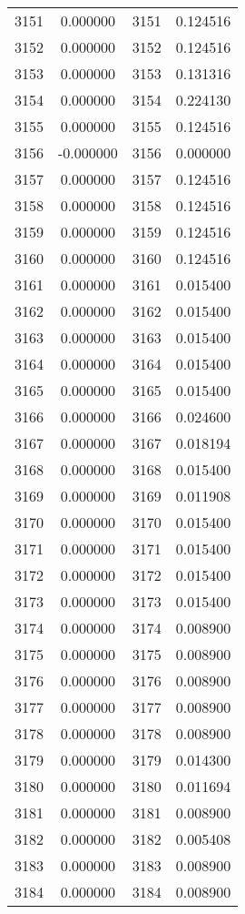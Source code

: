 \documentclass[12pt]{article}
\begin{document}
\begin{longtable}{@{}cccc@{}}
3151 & 0.000000 & 3151 & 0.124516 \\
3152 & 0.000000 & 3152 & 0.124516 \\
3153 & 0.000000 & 3153 & 0.131316 \\
3154 & 0.000000 & 3154 & 0.224130 \\
3155 & 0.000000 & 3155 & 0.124516 \\
3156 & -0.000000 & 3156 & 0.000000 \\
3157 & 0.000000 & 3157 & 0.124516 \\
3158 & 0.000000 & 3158 & 0.124516 \\
3159 & 0.000000 & 3159 & 0.124516 \\
3160 & 0.000000 & 3160 & 0.124516 \\
3161 & 0.000000 & 3161 & 0.015400 \\
3162 & 0.000000 & 3162 & 0.015400 \\
3163 & 0.000000 & 3163 & 0.015400 \\
3164 & 0.000000 & 3164 & 0.015400 \\
3165 & 0.000000 & 3165 & 0.015400 \\
3166 & 0.000000 & 3166 & 0.024600 \\
3167 & 0.000000 & 3167 & 0.018194 \\
3168 & 0.000000 & 3168 & 0.015400 \\
3169 & 0.000000 & 3169 & 0.011908 \\
3170 & 0.000000 & 3170 & 0.015400 \\
3171 & 0.000000 & 3171 & 0.015400 \\
3172 & 0.000000 & 3172 & 0.015400 \\
3173 & 0.000000 & 3173 & 0.015400 \\
3174 & 0.000000 & 3174 & 0.008900 \\
3175 & 0.000000 & 3175 & 0.008900 \\
3176 & 0.000000 & 3176 & 0.008900 \\
3177 & 0.000000 & 3177 & 0.008900 \\
3178 & 0.000000 & 3178 & 0.008900 \\
3179 & 0.000000 & 3179 & 0.014300 \\
3180 & 0.000000 & 3180 & 0.011694 \\
3181 & 0.000000 & 3181 & 0.008900 \\
3182 & 0.000000 & 3182 & 0.005408 \\
3183 & 0.000000 & 3183 & 0.008900 \\
3184 & 0.000000 & 3184 & 0.008900 \\

\end{longtable}
\end{document}
